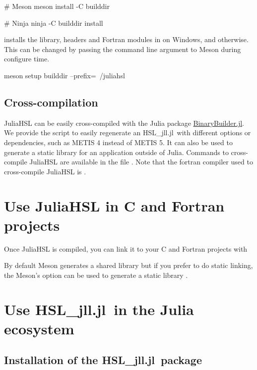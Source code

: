 \documentclass[gdweb]{geradwp}
\newcommand{\JuliaHSL}{JuliaHSL\xspace}  %
\newcommand{\HSLjll}{HSL\_jll.jl}
\begin{document}
\begin{jllisting}
# Meson
meson install -C builddir

# Ninja
ninja -C builddir install
\end{jllisting}
installs the library, headers and Fortran modules in  on Windows, and  otherwise.
This can be changed by passing the command line argument  to Meson during configure time.
\begin{jllisting}
meson setup builddir --prefix=~/juliahsl
\end{jllisting}

\subsection{Cross-compilation}

\JuliaHSL can be easily cross-compiled with the Julia package \href{https://github.com/JuliaPackaging/BinaryBuilder.jl}{BinaryBuilder.jl}.
We provide the script  to easily regenerate an \HSLjll~with different options or dependencies, such as METIS 4 instead of METIS 5.
It can also be used to generate a static library  for an application outside of Julia.
Commands to cross-compile \JuliaHSL are available in the file .
Note that the fortran compiler used to cross-compile \JuliaHSL is .

\section{Use \JuliaHSL in C and Fortran projects}

Once \JuliaHSL is compiled, you can link it to your C and Fortran projects with
By default Meson generates a shared library but if you prefer to do static linking, the Meson's option  can be used to generate a static library .

\section{Use \HSLjll~in the Julia ecosystem}

\subsection{Installation of the \HSLjll~package}
\end{document}
